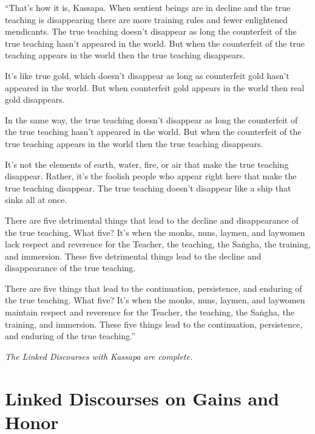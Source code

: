 \documentclass[12pt,openany]{book}%
\let\oldcontentsline\contentsline
\newcommand{\nopagecontentsline}[3]{\oldcontentsline{#1}{#2}{}}
\newcommand*{\scendsutta}[1]{\begin{center}\textit{#1}\end{center}}
\begin{document}
“That’s how it is, Kassapa. When sentient beings are in decline and the true teaching is disappearing there are more training rules and fewer enlightened mendicants. The true teaching doesn’t disappear as long the counterfeit of the true teaching hasn’t appeared in the world. But when the counterfeit of the true teaching appears in the world then the true teaching disappears. 

It’s like true gold, which doesn’t disappear as long as counterfeit gold hasn’t appeared in the world. But when counterfeit gold appears in the world then real gold disappears. 

In the same way, the true teaching doesn’t disappear as long the counterfeit of the true teaching hasn’t appeared in the world. But when the counterfeit of the true teaching appears in the world then the true teaching disappears. 

It’s not the elements of earth, water, fire, or air that make the true teaching disappear. Rather, it’s the foolish people who appear right here that make the true teaching disappear. The true teaching doesn’t disappear like a ship that sinks all at once. 

There are five detrimental things that lead to the decline and disappearance of the true teaching. What five? It’s when the monks, nuns, laymen, and laywomen lack respect and reverence for the Teacher, the teaching, the \textsanskrit{Saṅgha}, the training, and immersion. These five detrimental things lead to the decline and disappearance of the true teaching. 

There are five things that lead to the continuation, persistence, and enduring of the true teaching. What five? It’s when the monks, nuns, laymen, and laywomen maintain respect and reverence for the Teacher, the teaching, the \textsanskrit{Saṅgha}, the training, and immersion. These five things lead to the continuation, persistence, and enduring of the true teaching.” 

\scendsutta{The Linked Discourses with Kassapa are complete. }

%
\part*{Linked Discourses on Gains and Honor}
\markboth{}{}
\addtocontents{toc}{\let\protect\contentsline\protect\oldcontentsline}
\end{document}
